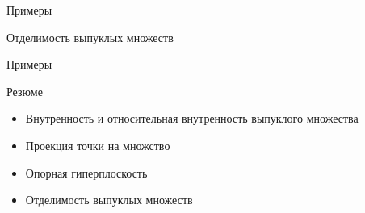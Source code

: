 \documentclass[12pt,russian]{beamer}
\begin{document}
\begin{frame}{Примеры}

\end{frame}

\begin{frame}{Отделимость выпуклых множеств}

\end{frame}

\begin{frame}{Примеры}

\end{frame}

\begin{frame}{Резюме}
\begin{itemize}
\item Внутренность и относительная внутренность выпуклого множества
\item Проекция точки на множство
\item Опорная гиперплоскость
\item Отделимость выпуклых множеств
\end{itemize}
\end{frame}
\end{document}

